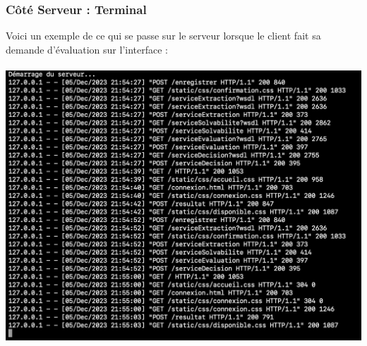 \documentclass{article}
\begin{document}
    \subsubsection{Côté Serveur : Terminal}
    Voici un exemple de ce qui se passe sur le serveur lorsque le client fait sa demande d'évaluation sur l'interface : \\
    \\
    \includegraphics[width=\textwidth]{Images/8.2/serveur.png}

\newpage
\end{document}
